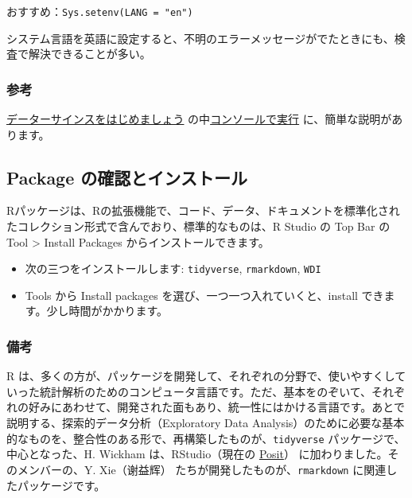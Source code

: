 \documentclass[
]{article}
\providecommand{\tightlist}{%
  \setlength{\itemsep}{0pt}\setlength{\parskip}{0pt}}
\begin{document}
おすすめ：\texttt{Sys.setenv(LANG\ =\ "en")}

システム言語を英語に設定すると、不明のエラーメッセージがでたときにも、検査で解決できることが多い。

\hypertarget{ux53c2ux8003}{%
\subsubsection{参考}\label{ux53c2ux8003}}

\href{https://icu-hsuzuki.github.io/ds4aj/}{データーサインスをはじめましょう}
の中\href{https://icu-hsuzuki.github.io/ds4aj/ronrstudio.html\#コンソールで実行---run-in-console}{コンソールで実行}
に、簡単な説明があります。

\hypertarget{package-ux306eux78baux8a8dux3068ux30a4ux30f3ux30b9ux30c8ux30fcux30eb}{%
\subsection{Package
の確認とインストール}\label{package-ux306eux78baux8a8dux3068ux30a4ux30f3ux30b9ux30c8ux30fcux30eb}}

Rパッケージは、Rの拡張機能で、コード、データ、ドキュメントを標準化されたコレクション形式で含んでおり、標準的なものは、R
Studio の Top Bar の Tool \textgreater{} Install Packages
からインストールできます。

\begin{itemize}
\tightlist
\item
  次の三つをインストールします: \texttt{tidyverse}, \texttt{rmarkdown},
  \texttt{WDI}
\item
  Tools から Install packages を選び、一つ一つ入れていくと、install
  できます。少し時間がかかります。
\end{itemize}

\hypertarget{ux5099ux8003}{%
\subsubsection{備考}\label{ux5099ux8003}}

R
は、多くの方が、パッケージを開発して、それぞれの分野で、使いやすくしていった統計解析のためのコンピュータ言語です。ただ、基本をのぞいて、それぞれの好みにあわせて、開発された面もあり、統一性にはかける言語です。あとで説明する、探索的データ分析（Exploratory
Data
Analysis）のために必要な基本的なものを、整合性のある形で、再構築したものが、\texttt{tidyverse}
パッケージで、中心となった、H. Wickham は、RStudio（現在の
\href{https://posit.co}{Posit}） に加わりました。そのメンバーの、Y.
Xie（谢益辉） たちが開発したものが、\texttt{rmarkdown}
に関連したパッケージです。
\end{document}
